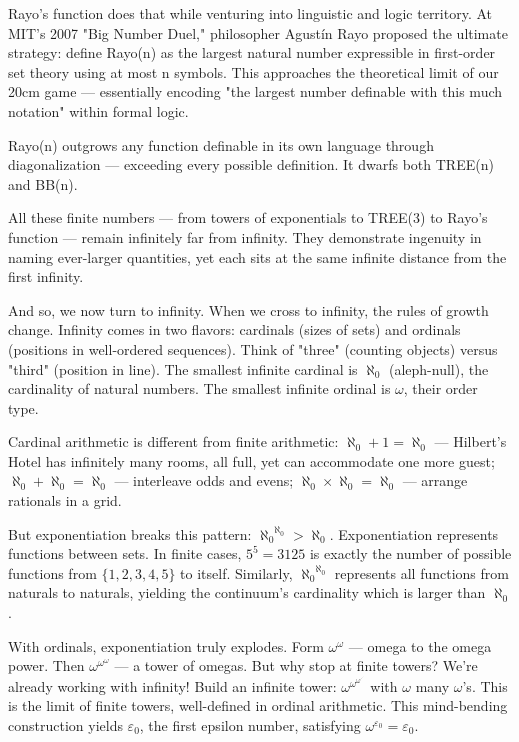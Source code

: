 Rayo's function does that while venturing into linguistic and logic territory. At MIT's 2007 "Big Number Duel," philosopher Agustín Rayo proposed the ultimate strategy: define Rayo(n) as the largest natural number expressible in first-order set theory using at most n symbols. This approaches the theoretical limit of our 20cm game — essentially encoding "the largest number definable with this much notation" within formal logic. 

Rayo(n) outgrows any function definable in its own language through diagonalization — exceeding every possible definition. It dwarfs both TREE(n) and BB(n).

All these finite numbers — from towers of exponentials to TREE(3) to Rayo's function — remain infinitely far from infinity. They demonstrate ingenuity in naming ever-larger quantities, yet each sits at the same infinite distance from the first infinity.

And so, we now turn to infinity. When we cross to infinity, the rules of growth change. Infinity comes in two flavors: cardinals (sizes of sets) and ordinals (positions in well-ordered sequences). Think of "three" (counting objects) versus "third" (position in line). The smallest infinite cardinal is $\aleph_0$ (aleph-null), the cardinality of natural numbers. The smallest infinite ordinal is $\omega$, their order type.

Cardinal arithmetic is different from finite arithmetic: $\aleph_0 + 1 = \aleph_0$ — Hilbert's Hotel has infinitely many rooms, all full, yet can accommodate one more guest; $\aleph_0 + \aleph_0 = \aleph_0$ — interleave odds and evens; $\aleph_0 \times \aleph_0 = \aleph_0$ — arrange rationals in a grid.

But exponentiation breaks this pattern: ${\aleph_0}^{\aleph_0} > \aleph_0$. Exponentiation represents functions between sets. In finite cases, $5^5 = 3125$ is exactly the number of possible functions from $\{1,2,3,4,5\}$ to itself. Similarly, ${\aleph_0}^{\aleph_0}$ represents all functions from naturals to naturals, yielding the continuum's cardinality which is larger than $\aleph_0$. 

With ordinals, exponentiation truly explodes. Form $\omega^\omega$ — omega to the omega power. Then $\omega^{\omega^\omega}$ — a tower of omegas. But why stop at finite towers? We're already working with infinity! Build an infinite tower: $\omega^{\omega^{\omega^{\cdot^{\cdot^{\cdot}}}}}$ with $\omega$ many $\omega$'s. This is the limit of finite towers, well-defined in ordinal arithmetic. This mind-bending construction yields $\varepsilon_0$, the first epsilon number, satisfying $\omega^{\varepsilon_0} = \varepsilon_0$.

